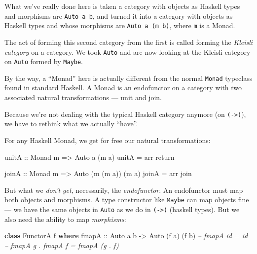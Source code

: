 \documentclass[]{article}
\newenvironment{Shaded}{}{}
\newcommand{\KeywordTok}[1]{\textcolor[rgb]{0.00,0.44,0.13}{\textbf{{#1}}}}
\newcommand{\DataTypeTok}[1]{\textcolor[rgb]{0.56,0.13,0.00}{{#1}}}
\newcommand{\CommentTok}[1]{\textcolor[rgb]{0.38,0.63,0.69}{\textit{{#1}}}}
\newcommand{\OtherTok}[1]{\textcolor[rgb]{0.00,0.44,0.13}{{#1}}}
\newcommand{\FunctionTok}[1]{\textcolor[rgb]{0.02,0.16,0.49}{{#1}}}
\newcommand{\NormalTok}[1]{{#1}}
\begin{document}
What we've really done here is taken a category with objects as Haskell
types and morphisms are \texttt{Auto\ a\ b}, and turned it into a
category with objects as Haskell types and whose morphisms are
\texttt{Auto\ a\ (m\ b)}, where \texttt{m} is a Monad.

The act of forming this second category from the first is called forming
the \emph{Kleisli category} on a category. We took \texttt{Auto} and are
now looking at the Kleisli category on \texttt{Auto} formed by
\texttt{Maybe}.

By the way, a ``Monad'' here is actually different from the normal
\texttt{Monad} typeclass found in standard Haskell. A Monad is an
endofunctor on a category with two associated natural transformations
--- unit and join.

Because we're not dealing with the typical Haskell category anymore (on
\texttt{(-\textgreater{})}), we have to rethink what we actually
``have''.

For any Haskell Monad, we get for free our natural transformations:

\begin{Shaded}
\begin{Highlighting}[]
\OtherTok{unitA ::} \DataTypeTok{Monad} \NormalTok{m }\OtherTok{=>} \DataTypeTok{Auto} \NormalTok{a (m a)}
\NormalTok{unitA }\FunctionTok{=} \NormalTok{arr return}

\OtherTok{joinA ::} \DataTypeTok{Monad} \NormalTok{m }\OtherTok{=>} \DataTypeTok{Auto} \NormalTok{(m (m a)) (m a)}
\NormalTok{joinA }\FunctionTok{=} \NormalTok{arr join}
\end{Highlighting}
\end{Shaded}

But what we \emph{don't get}, necessarily, the \emph{endofunctor}. An
endofunctor must map both objects and morphisms. A type constructor like
\texttt{Maybe} can map objects fine --- we have the same objects in
\texttt{Auto} as we do in \texttt{(-\textgreater{})} (haskell types).
But we also need the ability to map \emph{morphisms}:

\begin{Shaded}
\begin{Highlighting}[]
\KeywordTok{class} \DataTypeTok{FunctorA} \NormalTok{f }\KeywordTok{where}
\OtherTok{    fmapA ::} \DataTypeTok{Auto} \NormalTok{a b }\OtherTok{->} \DataTypeTok{Auto} \NormalTok{(f a) (f b)}
    \CommentTok{-- fmapA id = id}
    \CommentTok{-- fmapA g . fmapA f = fmapA (g . f)}
\end{Highlighting}
\end{Shaded}
\end{document}
